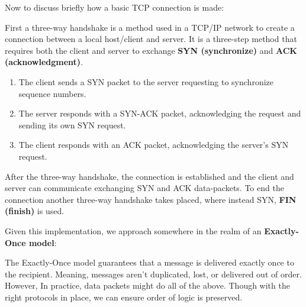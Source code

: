 \noindent
Now to discuss briefly how a basic TCP connection is made:
\begin{Def}

    First a three-way handshake is a method used in a TCP/IP network to create a connection between a local host/client and server. 
    It is a three-step method that requires both the client and server to exchange \textbf{SYN (synchronize)}
     and \textbf{ACK (acknowledgment)}.
     \begin{enumerate}
        \item The client sends a SYN packet to the server requesting to synchronize sequence numbers.
        \item The server responds with a SYN-ACK packet, acknowledging the request and sending its own SYN request.
        \item The client responds with an ACK packet, acknowledging the server's SYN request.
     \end{enumerate}
    
    \noindent
    After the three-way handshake, the connection is established and the client and server can communicate exchanging SYN and ACK data-packets.
    To end the connection another three-way handshake takes placed, where instead SYN, \textbf{FIN (finish)} is used.
\end{Def}

\noindent
Given this implementation, we approach somewhere in the realm of an \textbf{Exactly-Once model}:

\begin{Def}

    The Exactly-Once model guarantees that a message is delivered exactly once to the recipient. Meaning, messages aren't duplicated, lost, or delivered out of order.
    However, In practice, data packets might do all of the above. Though with the right
    protocols in place, we can ensure order of logic is preserved.
\end{Def}

